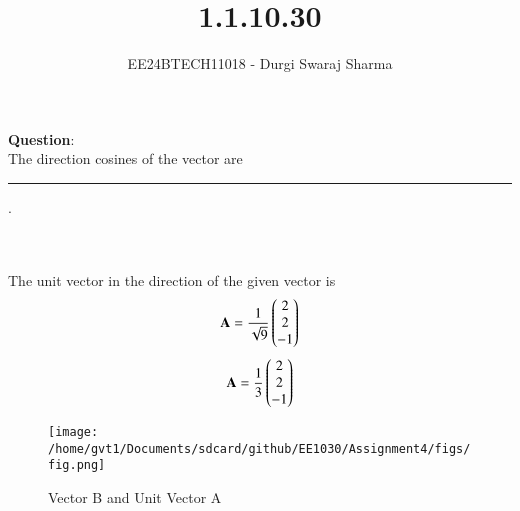 \documentclass[journal]{IEEEtran}
\begin{document}

\vspace{3cm}

\title{1.1.10.30}
\author{EE24BTECH11018 - Durgi Swaraj Sharma}

{\let\newpage\relax\maketitle}

\renewcommand{\thefigure}{\theenumi}
\renewcommand{\thetable}{\theenumi}
\setlength{\intextsep}{10pt} %


\renewcommand{\thetable}{\theenumi}

 \textbf{Question}:\\
The direction cosines of the vector  are \rule{1cm}{0.2pt}. \\

\solution\\
\begin{table}[h!]    
      \centering
      
    \end{table}\\
The unit vector in the direction of the given vector is \\
\begin{align}
	\mathbf{A} = \frac{1}{\sqrt{9}} \begin{pmatrix}2 \\ 2 \\ -1\end{pmatrix} \label{eq1.1.10.30.1}
\end{align}
\begin{align}
	\mathbf{A} = \frac{1}{3} \begin{pmatrix}2 \\ 2 \\ -1\end{pmatrix} \label{eq1.1.10.30.2}
\end{align}

\begin{figure}[h]
        \centering
       \texttt{[image: /home/gvt1/Documents/sdcard/github/EE1030/Assignment4/figs/fig.png]}  
       \caption{Vector B and Unit Vector A}
       \label{graph}
    \end{figure}
\end{document}
